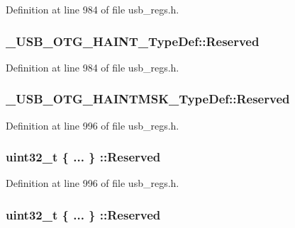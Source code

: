 Definition at line 984 of file usb\-\_\-regs.\-h.

\hypertarget{group___u_s_b___o_t_g___d_r_i_v_e_r_ga9c409040b625226f65c1c50cf02772fb}{
\subsubsection[{Reserved}]{ \-\_\-\-U\-S\-B\-\_\-\-O\-T\-G\-\_\-\-H\-A\-I\-N\-T\-\_\-\-Type\-Def\-::\-Reserved}}\label{group___u_s_b___o_t_g___d_r_i_v_e_r_ga9c409040b625226f65c1c50cf02772fb}


Definition at line 984 of file usb\-\_\-regs.\-h.

\hypertarget{group___u_s_b___o_t_g___d_r_i_v_e_r_ga0b3bf390ca5997788021a23ac28ec682}{
\subsubsection[{Reserved}]{ \-\_\-\-U\-S\-B\-\_\-\-O\-T\-G\-\_\-\-H\-A\-I\-N\-T\-M\-S\-K\-\_\-\-Type\-Def\-::\-Reserved}}\label{group___u_s_b___o_t_g___d_r_i_v_e_r_ga0b3bf390ca5997788021a23ac28ec682}


Definition at line 996 of file usb\-\_\-regs.\-h.

\hypertarget{group___u_s_b___o_t_g___d_r_i_v_e_r_ga9e1866d9825b60db32d2369821fd7323}{
\subsubsection[{Reserved}]{\setlength{\rightskip}{0pt plus 5cm}uint32\-\_\-t \{ ... \} \-::Reserved}}\label{group___u_s_b___o_t_g___d_r_i_v_e_r_ga9e1866d9825b60db32d2369821fd7323}


Definition at line 996 of file usb\-\_\-regs.\-h.

\hypertarget{group___u_s_b___o_t_g___d_r_i_v_e_r_gabf97b85f5f442089b9b232b0afe4ba31}{
\subsubsection[{Reserved}]{\setlength{\rightskip}{0pt plus 5cm}uint32\-\_\-t \{ ... \} \-::Reserved}}\label{group___u_s_b___o_t_g___d_r_i_v_e_r_gabf97b85f5f442089b9b232b0afe4ba31}


